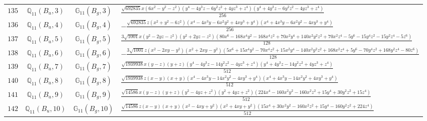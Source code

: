 \documentclass[fleqn,8pt,landscape]{jsarticle}
\begin{document}
\begin{table}[ht!]
\begin{center}
\begin{tabular}{cccl}
$ 135 $ & $ \mathbb{Q}_{11}(B_{u},3) $ & $ \mathbb{G}_{11}(B_{g},3) $ & $ \frac{\sqrt{692835} x \left(6 x^{2} - y^{2} - z^{2}\right) \left(y^{4} - 4 y^{3} z - 6 y^{2} z^{2} + 4 y z^{3} + z^{4}\right) \left(y^{4} + 4 y^{3} z - 6 y^{2} z^{2} - 4 y z^{3} + z^{4}\right)}{256} $ \\
$ 136 $ & $ \mathbb{Q}_{11}(B_{u},4) $ & $ \mathbb{G}_{11}(B_{g},4) $ & $ - \frac{\sqrt{692835} z \left(x^{2} + y^{2} - 6 z^{2}\right) \left(x^{4} - 4 x^{3} y - 6 x^{2} y^{2} + 4 x y^{3} + y^{4}\right) \left(x^{4} + 4 x^{3} y - 6 x^{2} y^{2} - 4 x y^{3} + y^{4}\right)}{256} $ \\
$ 137 $ & $ \mathbb{Q}_{11}(B_{u},5) $ & $ \mathbb{G}_{11}(B_{g},5) $ & $ \frac{3 \sqrt{1001} x \left(y^{2} - 2 y z - z^{2}\right) \left(y^{2} + 2 y z - z^{2}\right) \left(80 x^{6} - 168 x^{4} y^{2} - 168 x^{4} z^{2} + 70 x^{2} y^{4} + 140 x^{2} y^{2} z^{2} + 70 x^{2} z^{4} - 5 y^{6} - 15 y^{4} z^{2} - 15 y^{2} z^{4} - 5 z^{6}\right)}{128} $ \\
$ 138 $ & $ \mathbb{Q}_{11}(B_{u},6) $ & $ \mathbb{G}_{11}(B_{g},6) $ & $ - \frac{3 \sqrt{1001} z \left(x^{2} - 2 x y - y^{2}\right) \left(x^{2} + 2 x y - y^{2}\right) \left(5 x^{6} + 15 x^{4} y^{2} - 70 x^{4} z^{2} + 15 x^{2} y^{4} - 140 x^{2} y^{2} z^{2} + 168 x^{2} z^{4} + 5 y^{6} - 70 y^{4} z^{2} + 168 y^{2} z^{4} - 80 z^{6}\right)}{128} $ \\
$ 139 $ & $ \mathbb{Q}_{11}(B_{u},7) $ & $ \mathbb{G}_{11}(B_{g},7) $ & $ \frac{\sqrt{1939938} x \left(y - z\right) \left(y + z\right) \left(y^{4} - 4 y^{3} z - 14 y^{2} z^{2} - 4 y z^{3} + z^{4}\right) \left(y^{4} + 4 y^{3} z - 14 y^{2} z^{2} + 4 y z^{3} + z^{4}\right)}{512} $ \\
$ 140 $ & $ \mathbb{Q}_{11}(B_{u},8) $ & $ \mathbb{G}_{11}(B_{g},8) $ & $ \frac{\sqrt{1939938} z \left(x - y\right) \left(x + y\right) \left(x^{4} - 4 x^{3} y - 14 x^{2} y^{2} - 4 x y^{3} + y^{4}\right) \left(x^{4} + 4 x^{3} y - 14 x^{2} y^{2} + 4 x y^{3} + y^{4}\right)}{512} $ \\
$ 141 $ & $ \mathbb{Q}_{11}(B_{u},9) $ & $ \mathbb{G}_{11}(B_{g},9) $ & $ \frac{\sqrt{14586} x \left(y - z\right) \left(y + z\right) \left(y^{2} - 4 y z + z^{2}\right) \left(y^{2} + 4 y z + z^{2}\right) \left(224 x^{4} - 160 x^{2} y^{2} - 160 x^{2} z^{2} + 15 y^{4} + 30 y^{2} z^{2} + 15 z^{4}\right)}{512} $ \\
$ 142 $ & $ \mathbb{Q}_{11}(B_{u},10) $ & $ \mathbb{G}_{11}(B_{g},10) $ & $ \frac{\sqrt{14586} z \left(x - y\right) \left(x + y\right) \left(x^{2} - 4 x y + y^{2}\right) \left(x^{2} + 4 x y + y^{2}\right) \left(15 x^{4} + 30 x^{2} y^{2} - 160 x^{2} z^{2} + 15 y^{4} - 160 y^{2} z^{2} + 224 z^{4}\right)}{512} $ \\

\end{tabular}
\end{center}
\end{table}
\end{document}
